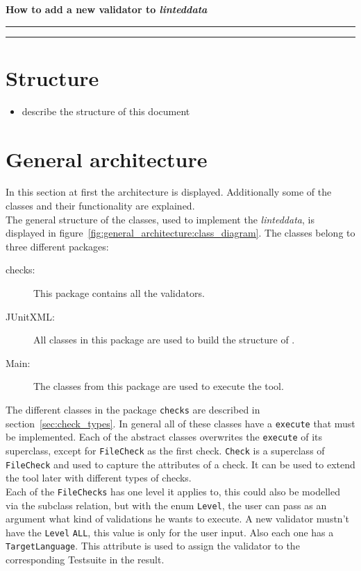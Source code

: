 \documentclass[11pt,a4paper]{article}
\newcommand{\function}[1]{\texttt{#1}}
\newcommand{\class}[1]{\texttt{#1}}
\newcommand{\enum}[1]{\texttt{#1}}
\newcommand{\package}[1]{\texttt{#1}}
\newcommand{\toolname}{\textit{linteddata}}
\begin{document}
\begin{center}
\begin{LARGE}
\textbf{How to add a new validator to \toolname}
\end{LARGE}
\end{center}
\hrule
\tableofcontents
\bigskip
\hrule
%
\section{Structure}
%
\begin{itemize}
	\item describe the structure of this document
\end{itemize}
%
\section{General architecture}
%
In this section at first the architecture is displayed. 
Additionally some of the classes and their functionality are explained.  
\\ 
The general structure of the classes, used to implement the \toolname , is displayed in figure~\ref{fig:general_architecture:class_diagram}. 
The classes belong to three different packages: 
\begin{description}
	\item[checks:] This package contains all the validators. 
	\item[JUnitXML:] All classes in this package are used to build the structure of \cite{JUnitXML_ibm}. 
	\item[Main:] The classes from this package are used to execute the tool. 
\end{description}
%
The different classes in the package \package{checks} are described in section~\ref{sec:check_types}. 
In general all of these classes have a \function{execute} that must be implemented. 
Each of the abstract classes overwrites the \function{execute} of its superclass, except for \class{FileCheck} as the first check. 
\class{Check} is a superclass of \class{FileCheck} and used to capture the attributes of a check. 
It can be used to extend the tool later with different types of checks. 
\\
Each of the \class{FileChecks} has one level it applies to, this could also be modelled via the subclass relation, but with the enum \enum{Level}, the user can pass as an argument what kind of validations he wants to execute. 
A new validator mustn't have the \enum{Level} \enum{ALL}, this value is only for the user input. 
Also each one has a \enum{TargetLanguage}. 
This attribute is used to assign the validator to the corresponding Testsuite in the result. 
\end{document}
